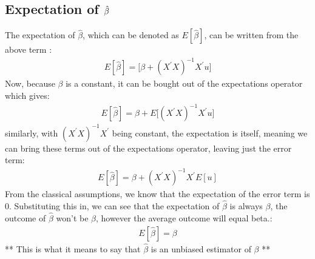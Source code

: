 \documentclass[letterpaper,10pt,english]{jupyterBook}
\begin{document}
\subsection{Expectation of \protect\(\hat\beta\protect\)}
\label{\detokenize{parts/econometric-theory/linearmodels:expectation-of-hat-beta}}
The expectation of \(\hat\beta\), which can be denoted as \(E[\hat\beta]\), can be written from the above term :
\begin{equation*}
\begin{split} E[\hat\beta] =  \bigg [\beta+\left(X^{\prime} X\right)^{-1} X^{\prime} u \bigg]\end{split}
\end{equation*}
Now, because \(\beta\) is a constant, it can be bought out of the expectations operator which gives:
\begin{equation*}
\begin{split}  E[\hat\beta] = \beta+ E \bigg [\left(X^{\prime} X\right)^{-1} X^{\prime} u \bigg]\end{split}
\end{equation*}
similarly, with \(\left(X^{\prime} X\right)^{-1} X^{\prime}\) being constant, the expectation is itself, meaning we can bring these terms out of the expectations operator, leaving just the error term:
\begin{equation*}
\begin{split}  E[\hat\beta] =\beta+ \left(X^{\prime} X\right)^{-1} X^{\prime} E [u]\end{split}
\end{equation*}
From the classical assumptions, we know that the expectation of the error term is 0. Substituting this in, we can see that the expectation of \(\hat\beta\) is always \(\beta\), the outcome of \(\hat\beta\) won’t be
\(\beta\), however the average outcome will equal beta.:
\begin{equation*}
\begin{split}E[\hat\beta] = \beta\end{split}
\end{equation*}
** This is what it means to say that \(\hat\beta\) is an unbiased estimator of \(\beta\) **
\end{document}
